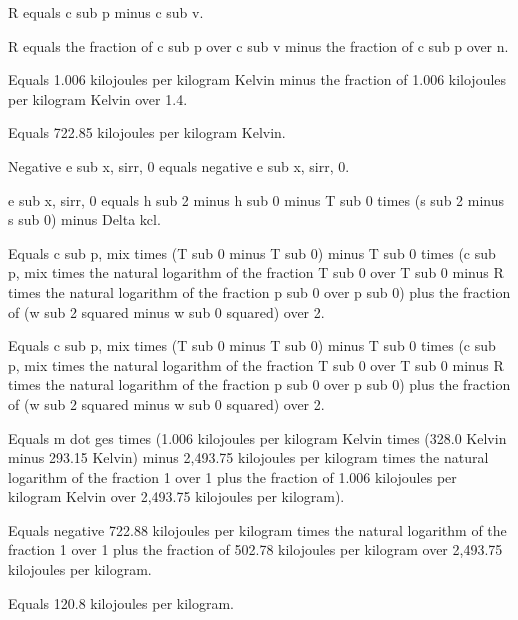 R equals c sub p minus c sub v.

R equals the fraction of c sub p over c sub v minus the fraction of c sub p over n.

Equals 1.006 kilojoules per kilogram Kelvin minus the fraction of 1.006 kilojoules per kilogram Kelvin over 1.4.

Equals 722.85 kilojoules per kilogram Kelvin.

Negative e sub x, sirr, 0 equals negative e sub x, sirr, 0.

e sub x, sirr, 0 equals h sub 2 minus h sub 0 minus T sub 0 times (s sub 2 minus s sub 0) minus Delta kcl.

Equals c sub p, mix times (T sub 0 minus T sub 0) minus T sub 0 times (c sub p, mix times the natural logarithm of the fraction T sub 0 over T sub 0 minus R times the natural logarithm of the fraction p sub 0 over p sub 0) plus the fraction of (w sub 2 squared minus w sub 0 squared) over 2.

Equals c sub p, mix times (T sub 0 minus T sub 0) minus T sub 0 times (c sub p, mix times the natural logarithm of the fraction T sub 0 over T sub 0 minus R times the natural logarithm of the fraction p sub 0 over p sub 0) plus the fraction of (w sub 2 squared minus w sub 0 squared) over 2.

Equals m dot ges times (1.006 kilojoules per kilogram Kelvin times (328.0 Kelvin minus 293.15 Kelvin) minus 2,493.75 kilojoules per kilogram times the natural logarithm of the fraction 1 over 1 plus the fraction of 1.006 kilojoules per kilogram Kelvin over 2,493.75 kilojoules per kilogram).

Equals negative 722.88 kilojoules per kilogram times the natural logarithm of the fraction 1 over 1 plus the fraction of 502.78 kilojoules per kilogram over 2,493.75 kilojoules per kilogram.

Equals 120.8 kilojoules per kilogram.